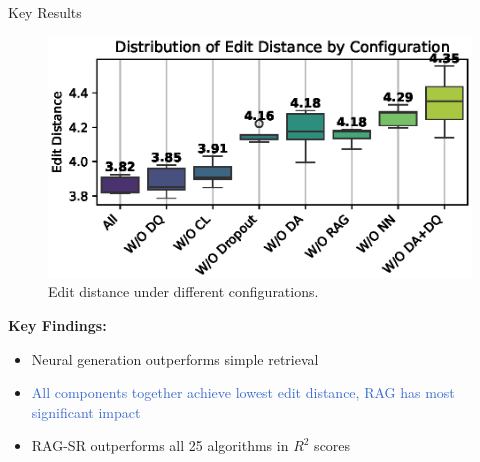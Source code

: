 \documentclass[final]{beamer}
\newcommand{\hlblue}[1]{\textcolor{mainblue}{#1}}
\newcommand{\hlpurple}[1]{\textcolor{accent}{#1}}
\newcommand{\hlgreen}[1]{\textcolor{highlight}{#1}}
\newcommand{\hlorange}[1]{\textcolor{warmorange}{#1}}
\newlength{\onecolwid}
\begin{document}
\begin{frame}[t]
\begin{columns}[t]
\begin{column}{\onecolwid}
\begin{block}{Key Results}
                    \begin{minipage}[t]{0.48\linewidth}
                        \begin{figure}
                            \centering
                            \includegraphics[width=\linewidth]{figs/ablation_study_accuracy_10.eps}
                            \caption{Edit distance under different configurations.}
                        \end{figure}
                    \end{minipage}
                    \hfill
                    \begin{minipage}[t]{0.48\linewidth}
                        \vspace*{.5cm} %
                        \textbf{\hlblue{Key Findings:}}
                        \begin{itemize}
                            \item \hlpurple{Neural generation outperforms simple retrieval}
                            \item \hlgreen{All components together achieve lowest edit distance, RAG has most significant impact}
                            \item \hlorange{RAG-SR outperforms all 25 algorithms in $R^2$ scores}
                        \end{itemize}
                    \end{minipage}

                    \vspace{45mm}


\end{block}
\end{column}
\end{columns}
\end{frame}
\end{document}
